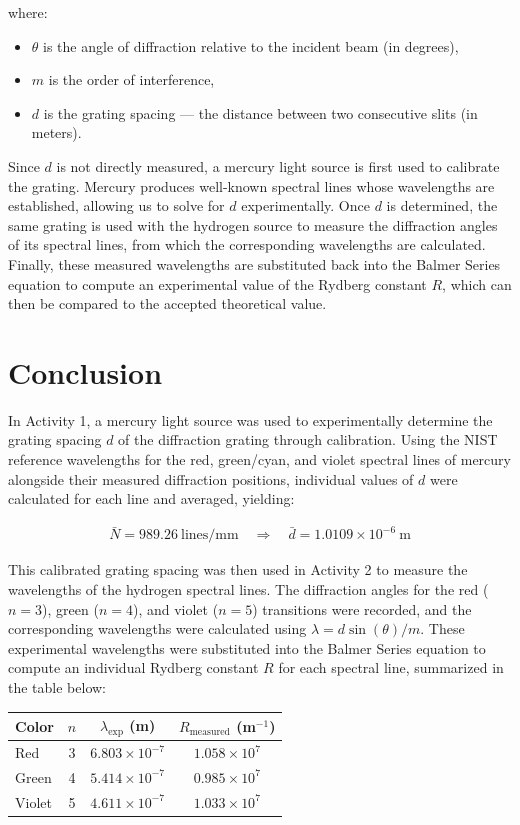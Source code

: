 \documentclass[12pt]{article}
\begin{document}
where:
\begin{itemize}
    \item $\theta$ is the angle of diffraction relative to the incident beam (in degrees),
    \item $m$ is the order of interference,
    \item $d$ is the grating spacing --- the distance between two consecutive slits (in meters).
\end{itemize}

Since $d$ is not directly measured, a mercury light source is first used to
calibrate the grating. Mercury produces well-known spectral lines whose wavelengths
are established, allowing us to solve for $d$ experimentally. Once $d$ is
determined, the same grating is used with the hydrogen source to measure the
diffraction angles of its spectral lines, from which the corresponding wavelengths
are calculated. Finally, these measured wavelengths are substituted back into the
Balmer Series equation to compute an experimental value of the Rydberg constant $R$,
which can then be compared to the accepted theoretical value.
\section{Conclusion}
In Activity 1, a mercury light source was used to experimentally determine the
grating spacing $d$ of the diffraction grating through calibration. Using the
NIST reference wavelengths for the red, green/cyan, and violet spectral lines of
mercury alongside their measured diffraction positions, individual values of $d$
were calculated for each line and averaged, yielding:

\begin{align*}
    \bar{N} = 989.26 \ \text{lines/mm} \quad \Longrightarrow \quad
    \bar{d} = 1.0109 \times 10^{-6} \ \text{m}
\end{align*}

This calibrated grating spacing was then used in Activity 2 to measure the
wavelengths of the hydrogen spectral lines. The diffraction angles for the red
($n = 3$), green ($n = 4$), and violet ($n = 5$) transitions were recorded, and
the corresponding wavelengths were calculated using $\lambda = d\sin(\theta)/m$.
These experimental wavelengths were substituted into the Balmer Series equation
to compute an individual Rydberg constant $R$ for each spectral line, summarized
in the table below:

\begin{center}
\begin{tabular}{lccc}
\hline
\textbf{Color} & \textbf{$n$} & \textbf{$\lambda_{\text{exp}}$ (m)} & \textbf{$R_{\text{measured}}$ (m$^{-1}$)} \\
\hline
Red    & 3 & $6.803 \times 10^{-7}$ & $1.058 \times 10^{7}$ \\
Green  & 4 & $5.414 \times 10^{-7}$ & $0.985 \times 10^{7}$ \\
Violet & 5 & $4.611 \times 10^{-7}$ & $1.033 \times 10^{7}$ \\
\hline
\end{tabular}
\end{center}
\end{document}
